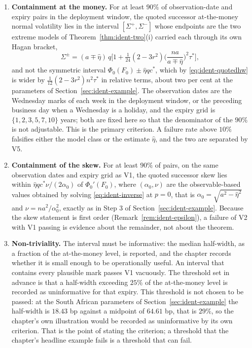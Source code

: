 \documentclass[../../../main.tex]{subfiles}
\begin{document}
\begin{enumerate}[label=\textbf{V\arabic*.},leftmargin=2.2\parindent]
\item \textbf{Containment at the money.} For at least $90\%$ of observation-date and expiry pairs in the deployment window, the quoted successor at-the-money normal volatility lies in the interval $[\Sigma^+,\Sigma^-]$ whose endpoints are the two extreme models of Theorem~\ref{thm:ident-two}(i) carried each through its own Hagan bracket,
\[
\Sigma^{\pm}=(a\mp\hat\eta)\,q\Big[1+\tfrac1{24}(2-3r^2)\Big(\frac{na}{a\mp\hat\eta}\Big)^{2}\tau^*\Big],
\]
and not the symmetric interval $\Phi_0(F_0)\pm\hat\eta qc^*$, which by \eqref{eq:ident-quotedhw} is wider by $\tfrac1{12}(2-3r^2)n^2\tau^*$ in relative terms, about two per cent at the parameters of Section~\ref{sec:ident-example}. The observation dates are the Wednesday marks of each week in the deployment window, or the preceding business day when a Wednesday is a holiday, and the expiry grid is $\{1,2,3,5,7,10\}$ years; both are fixed here so that the denominator of the $90\%$ is not adjustable. This is the primary criterion. A failure rate above $10\%$ falsifies either the model class or the estimate $\hat\eta$, and the two are separated by V5.
\item \textbf{Containment of the skew.} For at least $90\%$ of pairs, on the same observation dates and expiry grid as V1, the quoted successor skew lies within $\hat\eta qc^*\nu/(2\alpha_0)$ of $\Phi_0'(F_0)$, where $(\alpha_0,\nu)$ are the observable-based values obtained by solving \eqref{eq:ident-inverse} at $p=0$, that is $\alpha_0=\sqrt{a^2-\hat\eta^2}$ and $\nu=na^2/\alpha_0^2$, exactly as in Step 3 of Section~\ref{sec:ident-example}. Because the skew statement is first order (Remark~\ref{rem:ident-epsilon}), a failure of V2 with V1 passing is evidence about the remainder, not about the theorem.
\item \textbf{Non-triviality.} The interval must be informative: the median half-width, as a fraction of the at-the-money level, is reported, and the chapter records whether it is small enough to be operationally useful. An interval that contains every plausible mark passes V1 vacuously. The threshold set in advance is that a half-width exceeding $25\%$ of the at-the-money level is recorded as uninformative for that expiry. This threshold is not chosen to be passed: at the South African parameters of Section~\ref{sec:ident-example} the half-width is $18.43$ bp against a midpoint of $64.61$ bp, that is $29\%$, so the chapter's own illustration would be recorded as uninformative by its own criterion. That is the point of stating the criterion; a threshold that the chapter's headline example fails is a threshold that can fail.

\end{enumerate}
\end{document}

